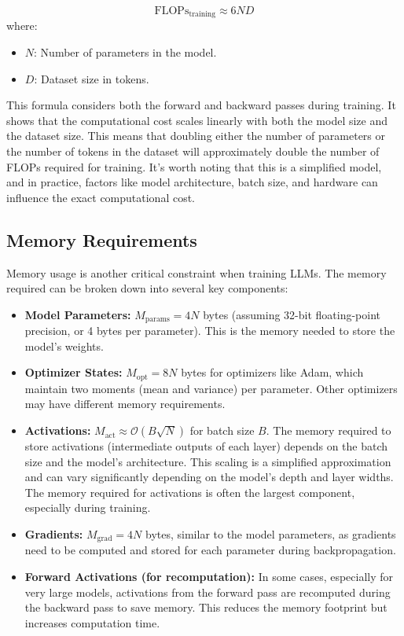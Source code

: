 \begin{equation}\label{eq:compute_scaling}
\text{FLOPs}_\text{training} \approx 6ND
\end{equation}
where:
\begin{itemize}[noitemsep]
    \item \(N\): Number of parameters in the model.
    \item \(D\): Dataset size in tokens.
\end{itemize}

This formula considers both the forward and backward passes during training. It shows that the computational cost scales linearly with both the model size and the dataset size. This means that doubling either the number of parameters or the number of tokens in the dataset will approximately double the number of FLOPs required for training.  It's worth noting that this is a simplified model, and in practice, factors like model architecture, batch size, and hardware can influence the exact computational cost.

\subsection{Memory Requirements}
\noindent
Memory usage is another critical constraint when training LLMs. The memory required can be broken down into several key components:

\begin{itemize}[noitemsep]
    \item \textbf{Model Parameters:} \(M_\text{params} = 4N\) bytes (assuming 32-bit floating-point precision, or 4 bytes per parameter). This is the memory needed to store the model's weights.
    \item \textbf{Optimizer States:} \(M_\text{opt} = 8N\) bytes for optimizers like Adam, which maintain two moments (mean and variance) per parameter. Other optimizers may have different memory requirements.
    \item \textbf{Activations:} \(M_\text{act} \approx \mathcal{O}(B \sqrt{N})\) for batch size \(B\). The memory required to store activations (intermediate outputs of each layer) depends on the batch size and the model's architecture. This scaling is a simplified approximation and can vary significantly depending on the model's depth and layer widths. The memory required for activations is often the largest component, especially during training.
    \item \textbf{Gradients:}  \(M_\text{grad} = 4N\) bytes, similar to the model parameters, as gradients need to be computed and stored for each parameter during backpropagation.
    \item \textbf{Forward Activations (for recomputation):} In some cases, especially for very large models, activations from the forward pass are recomputed during the backward pass to save memory. This reduces the memory footprint but increases computation time.
\end{itemize}

